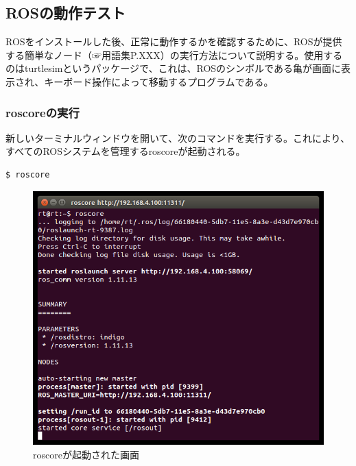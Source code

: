 \subsection{ROSの動作テスト}

ROSをインストールした後、正常に動作するかを確認するために、ROSが提供する簡単なノード（☞用語集P.XXX）の実行方法について説明する。使用するのはturtlesimというパッケージで、これは、ROSのシンボルである亀が画面に表示され、キーボード操作によって移動するプログラムである。

\subsubsection{roscoreの実行}

新しいターミナルウィンドウを開いて、次のコマンドを実行する。これにより、すべてのROSシステムを管理するroscoreが起動される。

\begin{lstlisting}[language=ROS]
$ roscore
\end{lstlisting}

\begin{figure}[h]
  \centering
  \includegraphics[width=0.9\columnwidth]{pictures/chapter2/pic_02_02.png}
  \caption{roscoreが起動された画面}
\end{figure}

